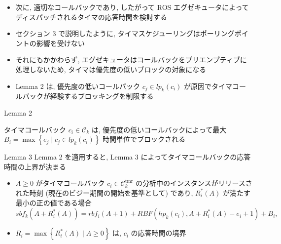 \begin{frame}{}
    \begin{itemize}
        \item 次に, 適切なコールバックであり, したがって ROS エグゼキュータによってディスパッチされるタイマの応答時間を検討する
\item セクション 3 で説明したように, タイマスケジューリングはポーリングポイントの影響を受けない
\item それにもかかわらず, エグゼキュータはコールバックをプリエンプティブに処理しないため, タイマは優先度の低いブロックの対象になる
\item Lemma 2 は, 優先度の低いコールバック $c_{j} \in l p_{k}\left(c_{i}\right)$ が原因でタイマコールバックが経験するブロッキングを制限する
    \end{itemize}
\end{frame}

\begin{frame}[label=lemma2]{Lemma 2}
    \begin{lemma}[]
        タイマコールバック $c_{i} \in \mathcal{C}_{k}$ は, 優先度の低いコールバックによって最大 $B_{i}=\max \left\{e_{j} \mid c_{j} \in l p_{k}\left(c_{i}\right)\right\}$ 時間単位でブロックされる
    \end{lemma}
\end{frame}

\begin{frame}[label=lemma3]{Lemma 3}
    Lemma 2 を適用すると, Lemma 3 によってタイマコールバックの応答時間の上界が決まる
    \begin{lemma}[]
        \begin{itemize}
            \item $A \geq 0$ がタイマコールバック $c_{i} \in \mathcal{C}_{k}^{\mathrm{tmr}}$ の分析中のインスタンスがリリースされた時刻 (現在のビジー期間の開始を基準として) であり, $R_{i}^{*}(A)$ が満たす最小の正の値である場合
                  \begin{equation*}
                      s b f_{k}\left(A+R_{i}^{*}(A)\right)=r b f_{i}(A+1)+R B F\left(h p_{k}\left(c_{i}\right), A+R_{i}^{*}(A)-e_{i}+1\right)+B_{i},
                  \end{equation*}
            \item $R_{i}=\max \left\{R_{i}^{*}(A) \mid A \geq 0\right\}$ は, $c_{i}$ の応答時間の境界
        \end{itemize}
    \end{lemma}
\end{frame}


